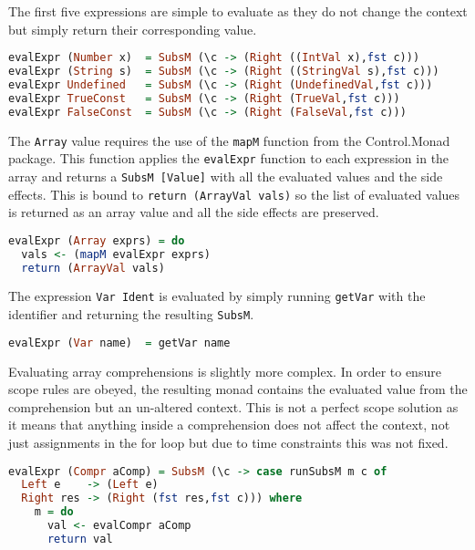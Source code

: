 \documentclass{article}
\begin{document}
The first five expressions are simple to evaluate as they do not change the context but simply return their corresponding value.

\begin{lstlisting}[language=Haskell]
evalExpr (Number x)  = SubsM (\c -> (Right ((IntVal x),fst c)))
evalExpr (String s)  = SubsM (\c -> (Right ((StringVal s),fst c)))
evalExpr Undefined   = SubsM (\c -> (Right (UndefinedVal,fst c)))
evalExpr TrueConst   = SubsM (\c -> (Right (TrueVal,fst c)))
evalExpr FalseConst  = SubsM (\c -> (Right (FalseVal,fst c)))
\end{lstlisting}

The \texttt{Array} value requires the use of the \texttt{mapM} function from the Control.Monad package. This function applies the \texttt{evalExpr} function to each expression in the array and returns a \texttt{SubsM [Value]} with all the evaluated values and the side effects. This is bound to \texttt{return (ArrayVal vals)} so the list of evaluated values is returned as an array value and all the side effects are preserved.

\begin{lstlisting}[language=Haskell]
evalExpr (Array exprs) = do
  vals <- (mapM evalExpr exprs)
  return (ArrayVal vals)
\end{lstlisting}

The expression \texttt{Var Ident} is evaluated by simply running \texttt{getVar} with the identifier and returning the resulting \texttt{SubsM}. 

\begin{lstlisting}[language=Haskell]
evalExpr (Var name)  = getVar name
\end{lstlisting}

Evaluating array comprehensions is slightly more complex. In order to ensure scope rules are obeyed, the resulting monad contains the evaluated value from the comprehension but an un-altered context. This is not a perfect scope solution as it means that anything inside a comprehension does not affect the context, not just assignments in the for loop but due to time constraints this was not fixed.

\begin{lstlisting}[language=Haskell]
evalExpr (Compr aComp) = SubsM (\c -> case runSubsM m c of
  Left e    -> (Left e)
  Right res -> (Right (fst res,fst c))) where
    m = do
      val <- evalCompr aComp
      return val
\end{lstlisting}
\end{document}
